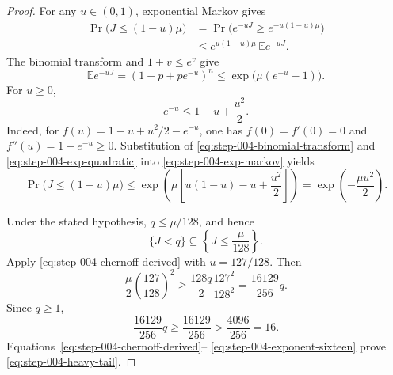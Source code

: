 \begin{proof}
For any \(u\in(0,1)\), exponential Markov gives
\begin{equation}\label{eq:step-004-exp-markov}
\begin{split}
\Pr\bigl(J\le(1-u)\mu\bigr)
&=\Pr\bigl(e^{-uJ}\ge e^{-u(1-u)\mu}\bigr)\\
&\le e^{u(1-u)\mu}\,\mathbb E e^{-uJ}.
\end{split}
\end{equation}
The binomial transform and \(1+v\le e^v\) give
\begin{equation}\label{eq:step-004-binomial-transform}
\mathbb E e^{-uJ}
=(1-p+pe^{-u})^n
\le\exp\bigl(\mu(e^{-u}-1)\bigr).
\end{equation}
For \(u\ge0\),
\begin{equation}\label{eq:step-004-exp-quadratic}
e^{-u}\le1-u+\frac{u^2}{2}.
\end{equation}
Indeed, for
\(f(u)=1-u+u^2/2-e^{-u}\), one has
\(f(0)=f'(0)=0\) and \(f''(u)=1-e^{-u}\ge0\).
Substitution of \eqref{eq:step-004-binomial-transform} and
\eqref{eq:step-004-exp-quadratic} into
\eqref{eq:step-004-exp-markov} yields
\begin{equation}\label{eq:step-004-chernoff-derived}
\Pr\bigl(J\le(1-u)\mu\bigr)
\le
\exp\!\left(\mu\left[u(1-u)-u+\frac{u^2}{2}\right]\right)
=\exp\!\left(-\frac{\mu u^2}{2}\right).
\end{equation}

Under the stated hypothesis, \(q\le\mu/128\), and hence
\begin{equation}\label{eq:step-004-event-inclusion}
\{J<q\}\subseteq\left\{J\le\frac{\mu}{128}\right\}.
\end{equation}
Apply \eqref{eq:step-004-chernoff-derived} with \(u=127/128\).  Then
\begin{equation}\label{eq:step-004-explicit-exponent}
\frac{\mu}{2}\left(\frac{127}{128}\right)^2
\ge
\frac{128q}{2}\frac{127^2}{128^2}
=\frac{16129}{256}q.
\end{equation}
Since \(q\ge1\),
\begin{equation}\label{eq:step-004-exponent-sixteen}
\frac{16129}{256}q
\ge\frac{16129}{256}
>\frac{4096}{256}=16.
\end{equation}
Equations~\eqref{eq:step-004-chernoff-derived}--
\eqref{eq:step-004-exponent-sixteen} prove
\eqref{eq:step-004-heavy-tail}.
\end{proof}

